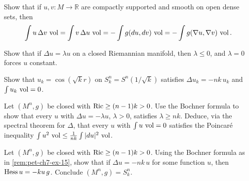 \begin{remark}
  \label{rem:pet-ch7-ex-12}
  Show that if $u,v:M\to\mathbb{R}$ are compactly supported and smooth on open dense
  sets, then
  \[
    \int u\,\Delta v\,\operatorname{vol}=\int v\,\Delta u\,\operatorname{vol}
    =-\int g(du,dv)\,\operatorname{vol}=-\int g(\nabla u,\nabla v)\,\operatorname{vol}.
  \]
\end{remark}

\begin{remark}
  \label{rem:pet-ch7-ex-13}
  Show that if $\Delta u=\lambda u$ on a closed Riemannian manifold, then
  $\lambda\le0$, and $\lambda=0$ forces $u$ constant.
\end{remark}

\begin{remark}
  \label{rem:pet-ch7-ex-14}
  Show that $u_k=\cos(\sqrt kr)$ on $S^n_k=S^n(1/\sqrt k)$ satisfies $\Delta
  u_k=-nk\,u_k$ and $\int u_k\,\operatorname{vol}=0$.
\end{remark}

\begin{remark}
  \label{rem:pet-ch7-ex-15}
  Let $(M^n,g)$ be closed with $\operatorname{Ric}\ge(n-1)k>0$. Use the Bochner formula to
  show that every $u$ with $\Delta u=-\lambda u$, $\lambda>0$, satisfies
  $\lambda\ge nk$. Deduce, via the spectral theorem for $\Delta$, that every
  $u$ with $\int u\,\operatorname{vol}=0$ satisfies the Poincaré inequality
  $\int u^2\,\operatorname{vol}\le\tfrac1{nk}\int|du|^2\,\operatorname{vol}$.
\end{remark}

\begin{remark}
  \label{rem:pet-ch7-ex-16}
  Let $(M^n,g)$ be closed with $\operatorname{Ric}\ge(n-1)k>0$. Using the Bochner formula as
  in \cref{rem:pet-ch7-ex-15}, show that if $\Delta u=-nk\,u$ for some
  function $u$, then $\operatorname{Hess} u=-ku\,g$. Conclude $(M^n,g)=S^n_k$.
\end{remark}

